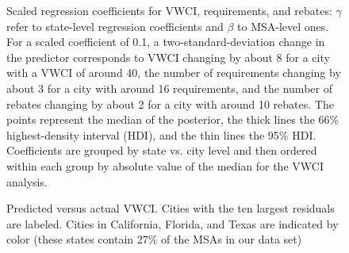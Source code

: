 \documentclass[draft,linenumbers]{agujournal}
\begin{document}
\begin{figure}[h]
\caption{Scaled regression coefficients for VWCI, requirements, and rebates: $\gamma$ refer to state-level regression coefficients and $\beta$ to MSA-level ones.
For a scaled coefficient of 0.1, a two-standard-deviation change in the predictor corresponds to VWCI changing by about 8 for a city with a VWCI of around 40, the number of requirements changing by about 3 for a city with around 16 requirements, and the number of rebates changing by about 2 for a city with around 10 rebates. The points represent the median of the posterior, the thick lines the 66\% highest-density interval (HDI), and the thin lines the 95\% HDI. Coefficients are grouped by state vs. city level and then ordered within each group by absolute value of the median for the VWCI analysis.}\label{fig:vwci_cat_plot}
\end{figure}


\begin{figure}[h]
\caption{Predicted versus actual VWCI. Cities with the ten largest residuals are labeled. Cities in California, Florida, and Texas are indicated by color (these states contain 27\% of the MSAs in our data set)}\label{fig:vwci_residuals}
\end{figure}


\listofchanges
\end{document}
